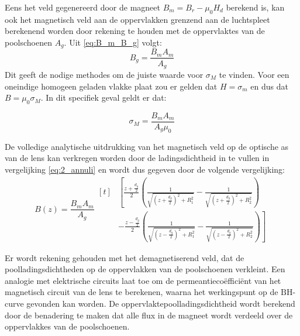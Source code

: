 \documentclass[we,twoside,openright,a4paper,11pt]{uantwerpenbamathesis}
\begin{document}
Eens het veld gegenereerd door de magneet $B_m=B_r-\mu_0 H_d$ berekend is, kan ook het magnetisch veld aan de oppervlakken grenzend aan de luchtspleet berekenend worden door rekening te houden met de oppervlaktes van de poolschoenen $A_g$. Uit \ref{eq:B_m_B_g} volgt:
\begin{equation}\label{eq:Br_yoke}
    B_g = \frac{B_m A_m}{A_g}
\end{equation}
Dit geeft de nodige methodes om de juiste waarde voor $\sigma_M$ te vinden. Voor een oneindige homogeen geladen vlakke plaat zou er gelden dat $H = \sigma_m$ en dus dat $B = \mu_0 \sigma_M$. In dit specifiek geval geldt er dat:

\begin{equation}\label{eq:charge_density}
    \sigma_M = \frac{B_m A_m}{A_g \mu_0}
\end{equation}

De volledige analytische uitdrukking van het magnetisch veld op de optische as van de lens kan verkregen worden door de ladingsdichtheid in te vullen in vergelijking \ref{eq:2_annuli} en wordt dus gegeven door de volgende vergelijking:\small
\begin{equation}\label{eq:analytical_B_field_final}
    B(z) = \frac{B_m A_m}{A_g}
    \begin{aligned}[t]
        &\left[ \frac{z+\frac{d_g}{2}}{2}\left(\frac{1}{\sqrt{\left(z+\frac{d_g}{2}\right)^2+R_1^2}}-\frac{1}{\sqrt{\left(z+\frac{d_g}{2}\right)^2+R_2^2}}\right)\right.\\
        &\left.- \frac{z-\frac{d_g}{2}}{2}\left(\frac{1}{\sqrt{\left(z-\frac{d_g}{2}\right)^2+R_1^2}}-\frac{1}{\sqrt{\left(z-\frac{d_g}{2}\right)^2+R_2^2}}\right)\right]
    \end{aligned}
\end{equation}

\begin{tcolorbox}[colback=blue!10!white, colframe=blue!40!white, sharp corners,title=Realisatie objectief 3]
    Er wordt rekening gehouden met het demagnetiserend veld, dat de poolladingsdichtheden op de oppervlakken van de poolschoenen verkleint. Een analogie met elektrische circuits laat toe om de permeantiecoëfficiënt van het magnetisch circuit van de lens te berekenen, waarna het werkingspunt op de $\mathrm{BH}$-curve gevonden kan worden. De oppervlaktepoolladingsdichtheid wordt berekend door de benadering te maken dat alle flux in de magneet wordt verdeeld over de oppervlakkes van de poolschoenen.
\end{tcolorbox}
\end{document}
